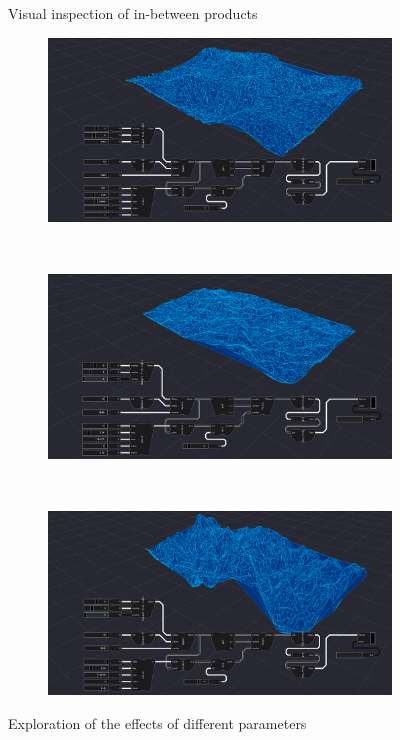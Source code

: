 \begin{figure}
\begin{subfigure}[b]{0.90\linewidth}
    \caption{}\label{fig:in-between-products:c}
  \end{subfigure}%
  \caption[]{Visual inspection of in-between products}%
  \label{fig:in-between-products}
\end{figure}

\begin{figure}
  \centering
  \begin{subfigure}[b]{0.90\linewidth}
    \centering
    \includegraphics[width=\linewidth]{explore-1.PNG}
  \end{subfigure}%
  \\ 
  \begin{subfigure}[b]{0.90\linewidth}
    \centering
    \includegraphics[width=\linewidth]{explore-2.PNG}
  \end{subfigure}%
  \\
  \begin{subfigure}[b]{0.90\linewidth}
    \centering
    \includegraphics[width=\linewidth]{explore-3.PNG}
  \end{subfigure}%
  \caption[]{Exploration of the effects of different parameters}%
  \label{fig:parametrization}
\end{figure}


